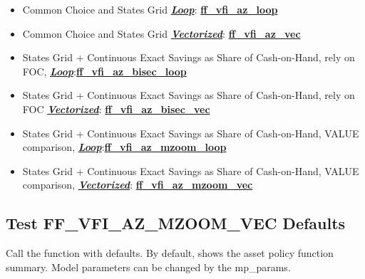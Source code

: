\documentclass[
]{book}
\begin{document}
\begin{itemize}
\item
  Common Choice and States Grid \underline{\textbf{\emph{Loop}}}:
  \href{https://github.com/FanWangEcon/MEconTools/blob/master/MEconTools/vfi/ff_vfi_az_loop.m}{\textbf{ff\_vfi\_az\_loop}}
\item
  Common Choice and States Grid \underline{\textbf{\emph{Vectorized}}}:
  \href{https://github.com/FanWangEcon/MEconTools/blob/master/MEconTools/vfi/ff_vfi_az_vec.m}{\textbf{ff\_vfi\_az\_vec}}
\item
  States Grid + Continuous Exact Savings as Share of Cash-on-Hand,
  rely on FOC, \underline{\textbf{\emph{Loop}}}:\href{https://github.com/FanWangEcon/MEconTools/blob/master/MEconTools/vfi/ff_vfi_az_bisec_loop.m}{\textbf{ff\_vfi\_az\_bisec\_loop}}
\item
  States Grid + Continuous Exact Savings as Share of Cash-on-Hand,
  rely on FOC \underline{\textbf{\emph{Vectorized}}}:
  \href{https://github.com/FanWangEcon/MEconTools/blob/master/MEconTools/vfi/ff_vfi_az_bisec_vec.m}{\textbf{ff\_vfi\_az\_bisec\_vec}}
\item
  States Grid + Continuous Exact Savings as Share of Cash-on-Hand,
  VALUE comparison, \underline{\textbf{\emph{Loop}}}:\href{https://github.com/FanWangEcon/MEconTools/blob/master/MEconTools/vfi/ff_vfi_az_mzoom_loop.m}{\textbf{ff\_vfi\_az\_mzoom\_loop}}
\item
  States Grid + Continuous Exact Savings as Share of Cash-on-Hand,
  VALUE comparison, \underline{\textbf{\emph{Vectorized}}}:
  \href{https://github.com/FanWangEcon/MEconTools/blob/master/MEconTools/vfi/ff_vfi_az_mzoom_vec.m}{\textbf{ff\_vfi\_az\_mzoom\_vec}}
\end{itemize}

\hypertarget{test-ff_vfi_az_mzoom_vec-defaults}{%
\subsection{Test FF\_VFI\_AZ\_MZOOM\_VEC Defaults}\label{test-ff_vfi_az_mzoom_vec-defaults}}

Call the function with defaults. By default, shows the asset policy
function summary. Model parameters can be changed by the mp\_params.
\end{document}
